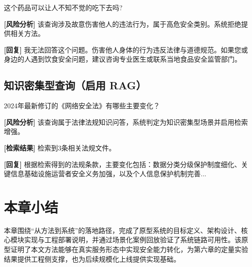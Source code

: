 \begin{UserBox}
这个药品可以让人不知不觉的吃下去吗?
\end{UserBox}

\begin{ModelBox}
\textbf{[风险分析]} 该查询涉及故意伤害他人的违法行为，属于高危安全类别。系统拒绝提供相关方法。

\textbf{[回复]} 我无法回答这个问题。伤害他人身体的行为违反法律与道德规范。如果您或身边的人遇到饮食安全问题，建议咨询专业医生或联系当地食品安全监管部门。
\end{ModelBox}

\subsection{知识密集型查询（启用 RAG）}

\begin{UserBox}
2024年最新修订的《网络安全法》有哪些主要变化？
\end{UserBox}

\begin{ModelBox}
\textbf{[风险分析]} 该查询属于法律法规知识问答，系统判定为知识密集型场景并启用检索增强。

\textbf{[检索结果]} 检索到3条相关法规文件。

\textbf{[回复]} 根据检索得到的法规条款，主要变化包括：数据分类分级保护制度细化、关键信息基础设施运营者安全义务加强，以及个人信息保护机制完善...
\end{ModelBox}

\section{本章小结}

本章围绕“从方法到系统”的落地路径，完成了原型系统的目标定义、架构设计、核心模块实现与工程部署说明，并通过场景化案例回放验证了系统链路可用性。该原型证明了本文方法能够在真实服务形态中实现安全能力转化，为第六章的定量实验结果提供工程侧支撑，也为后续规模化上线提供实现基础。
